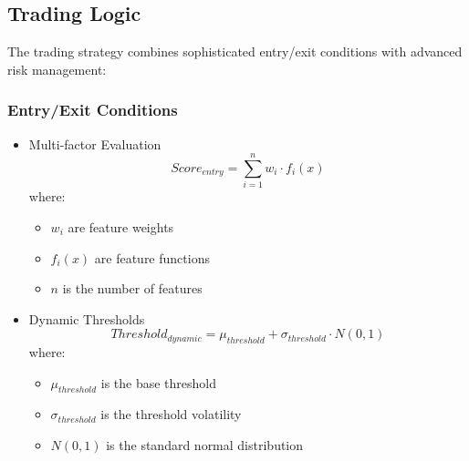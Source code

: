 \documentclass[conference]{IEEEtran}
\begin{document}
\subsection{Trading Logic}
The trading strategy combines sophisticated entry/exit conditions with advanced risk management:

\subsubsection{Entry/Exit Conditions}
\begin{itemize}
    \item Multi-factor Evaluation
    \begin{equation}
    Score_{entry} = \sum_{i=1}^n w_i \cdot f_i(x)
    \end{equation}
    where:
    \begin{itemize}
        \item $w_i$ are feature weights
        \item $f_i(x)$ are feature functions
        \item $n$ is the number of features
    \end{itemize}
    
    \item Dynamic Thresholds
    \begin{equation}
    Threshold_{dynamic} = \mu_{threshold} + \sigma_{threshold} \cdot N(0,1)
    \end{equation}
    where:
    \begin{itemize}
        \item $\mu_{threshold}$ is the base threshold
        \item $\sigma_{threshold}$ is the threshold volatility
        \item $N(0,1)$ is the standard normal distribution
    \end{itemize}
\end{itemize}
\end{document}
